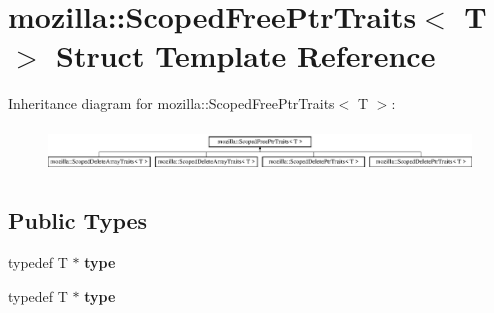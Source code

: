 \hypertarget{structmozilla_1_1_scoped_free_ptr_traits}{\section{mozilla\-:\-:Scoped\-Free\-Ptr\-Traits$<$ T $>$ Struct Template Reference}
\label{structmozilla_1_1_scoped_free_ptr_traits}
}
Inheritance diagram for mozilla\-:\-:Scoped\-Free\-Ptr\-Traits$<$ T $>$\-:\begin{figure}[H]
\begin{center}
\leavevmode
\includegraphics[height=1.176471cm]{structmozilla_1_1_scoped_free_ptr_traits}
\end{center}
\end{figure}
\subsection*{Public Types}
\begin{DoxyCompactItemize}
\item 
\hypertarget{structmozilla_1_1_scoped_free_ptr_traits_ad3d63745493867646562564fc318ce2c}{typedef T $\ast$ {\bfseries type}}\label{structmozilla_1_1_scoped_free_ptr_traits_ad3d63745493867646562564fc318ce2c}

\item 
\hypertarget{structmozilla_1_1_scoped_free_ptr_traits_ad3d63745493867646562564fc318ce2c}{typedef T $\ast$ {\bfseries type}}\label{structmozilla_1_1_scoped_free_ptr_traits_ad3d63745493867646562564fc318ce2c}

\end{DoxyCompactItemize}
